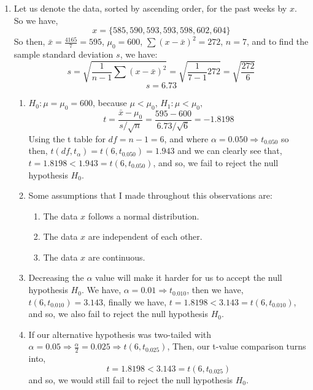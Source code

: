 \documentclass[12pt]{article}
\begin{document}
\begin{enumerate}
\begin{proof}
			$\therefore$ We have shown that $X$ and $Y$ are dependent, but they have zero covariance.
		\end{proof}
		\item Let us denote the data, sorted by ascending order, for the past weeks by $x$. So we have, 
		$$x = \{585, 590, 593, 593, 598, 602, 604\}$$
		So then, $\bar{x} = \frac{4165}{7} = 595$, $\mu_0 = 600$, $\sum (x - \bar{x})^2 = 272$, $n = 7$, and to find the sample standard deviation $s$, we have:
		$$s = \sqrt{\frac{1}{n - 1} \sum (x - \bar{x})^2} = \sqrt{\frac{1}{7 - 1} 272} = \sqrt{\frac{272}{6} }$$
		$$s = 6.73$$
		\begin{enumerate}
			\item $H_0 : \mu = \mu_0 = 600$, because $\mu < \mu_0$, $H_1 : \mu < \mu_0,$ 
				$$t = \frac{\bar{x} - \mu_0}{s / \sqrt{n}} = \frac{595 - 600}{6.73 / \sqrt{6}} = -1.8198$$
				Using the t table for $df = n - 1 = 6$, and where $\alpha = 0.050 \Rightarrow t_{0.050}$ so then, $t(df, t_{\alpha}) = t(6, t_{0.050}) = 1.943$ and we can clearly see that, $t = 1.8198 < 1.943 = t(6, t_{0.050})$, and so, we fail to reject the null hypothesis $H_0$.
			\item Some assumptions that I made throughout this observations are:
				\begin{enumerate}
					\item The data $x$ follows a normal distribution.
					\item The data $x$ are independent of each other.
					\item The data $x$ are continuous.
				\end{enumerate}
			\item Decreasing the $\alpha$ value will make it harder for us to accept the null hypothesis $H_0$. We have, $\alpha = 0.01 \Rightarrow t_{0.010}$, then we have, $t(6, t_{0.010}) = 3.143$, finally we have, $t = 1.8198 < 3.143 = t(6, t_{0.010})$, and so, we also fail to reject the null hypothesis $H_0$.
			
			\item If our alternative hypothesis was two-tailed
with $\alpha = 0.05 \Rightarrow \frac{\alpha}{2} = 0.025 \Rightarrow t(6, t_{0.025})$, Then, our t-value comparison turns into,
			$$t = 1.8198 < 3.143 = t(6, t_{0.025})$$
			and so, we would still fail to reject the null hypothesis $H_0$.
			

\end{enumerate}
\end{enumerate}
\end{document}
